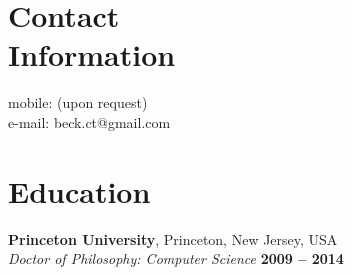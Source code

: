 \documentclass[margin,line]{resume}
\begin{document}
\begin{resume}

    \section{\mysidestyle Contact\\Information}

                                                          \hfill mobile: (upon request)          \vspace{0mm}\\\vspace{0mm}%
                                                          \hfill e-mail: beck.ct@gmail.com  \vspace{0mm}\\\vspace{-4.5mm}%





    \section{\mysidestyle Education}

    \textbf{Princeton University}, Princeton, New Jersey, USA \vspace{2mm}\\\vspace{1mm}%
    \textsl{Doctor of Philosophy: Computer Science} \hfill \textbf{ 2009 -- 2014 }\vspace{-3mm}\\\vspace{-1mm}%


\end{resume}
\end{document}
